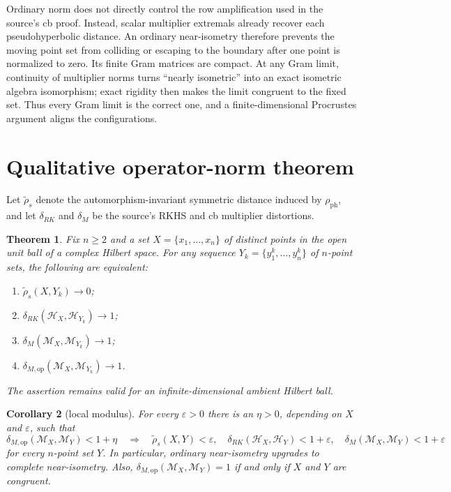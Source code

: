 \documentclass[11pt]{article}
\newtheorem{theorem}{Theorem}
\newtheorem{corollary}[theorem]{Corollary}
\newcommand{\M}{\mathcal M}
\newcommand{\Hh}{\mathcal H}
\newcommand{\ph}{\rho_{\mathrm{ph}}}
\newcommand{\dop}{\delta_{M,\mathrm{op}}}
\begin{document}
Ordinary norm does not directly control the row amplification used in the
source's cb proof.  Instead, scalar multiplier extremals already recover each
pseudohyperbolic distance.  An ordinary near-isometry therefore prevents the
moving point set from colliding or escaping to the boundary after one point
is normalized to zero.  Its finite Gram matrices are compact.  At any Gram
limit, continuity of multiplier norms turns ``nearly isometric'' into an
exact isometric algebra isomorphism; exact rigidity then makes the limit
congruent to the fixed set.  Thus every Gram limit is the correct one, and a
finite-dimensional Procrustes argument aligns the configurations.

\section{Qualitative operator-norm theorem}

Let $\widetilde\rho_s$ denote the automorphism-invariant symmetric distance
induced by $\ph$, and let $\delta_{RK}$ and $\delta_M$ be the source's RKHS
and cb multiplier distortions.

\begin{theorem}\label{thm:main}
Fix $n\ge2$ and a set $X=\{x_1,\ldots,x_n\}$ of distinct points in the open
unit ball of a complex Hilbert space.  For any sequence
$Y_k=\{y_1^k,\ldots,y_n^k\}$ of $n$-point sets, the following are equivalent:
\begin{enumerate}
 \item $\widetilde\rho_s(X,Y_k)\to0$;
 \item $\delta_{RK}(\Hh_X,\Hh_{Y_k})\to1$;
 \item $\delta_M(\M_X,\M_{Y_k})\to1$;
 \item $\dop(\M_X,\M_{Y_k})\to1$.
\end{enumerate}
The assertion remains valid for an infinite-dimensional ambient Hilbert
ball.
\end{theorem}

\begin{corollary}[local modulus]\label{cor:modulus}
For every $\varepsilon>0$ there is an $\eta>0$, depending on $X$ and
$\varepsilon$, such that
\[
 \dop(\M_X,\M_Y)<1+\eta
 \quad\Longrightarrow\quad
 \widetilde\rho_s(X,Y)<\varepsilon,
 \quad\delta_{RK}(\Hh_X,\Hh_Y)<1+\varepsilon,
 \quad\delta_M(\M_X,\M_Y)<1+\varepsilon
\]
for every $n$-point set $Y$.  In particular, ordinary near-isometry upgrades
to complete near-isometry.  Also, $\dop(\M_X,\M_Y)=1$ if and only if $X$ and
$Y$ are congruent.
\end{corollary}
\end{document}
